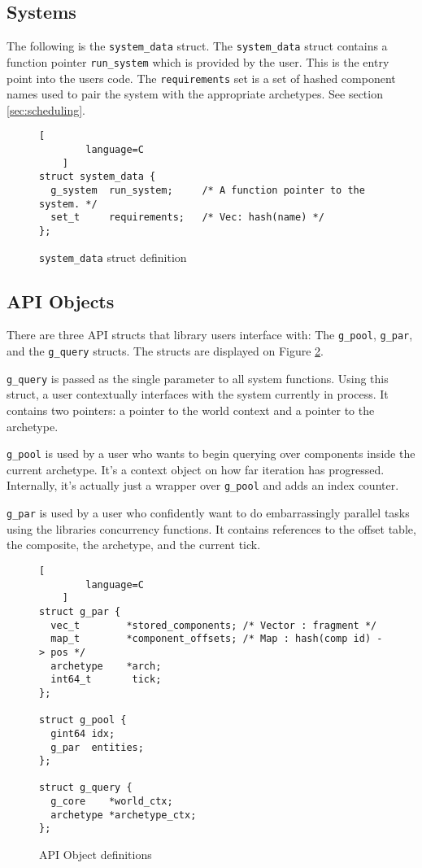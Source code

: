\subsection{Systems}
The following is the \texttt{system\_data} struct. The \texttt{system\_data} struct contains a function pointer \texttt{run\_system} which is provided by the user. This is the entry point into the users code. The \texttt{requirements} set is a set of hashed component names used to pair the system with the appropriate archetypes. See section \ref{sec:scheduling}.

\begin{figure}[H]
    \begin{lstlisting}[
        language=C
    ]
struct system_data {
  g_system  run_system;     /* A function pointer to the system. */
  set_t     requirements;   /* Vec: hash(name) */
};
    \end{lstlisting}
    \caption{\texttt{system\_data} struct definition}
    \label{code:sd_and_er}
\end{figure}

\subsection{API Objects}
There are three API structs that library users interface with: The \texttt{g\_pool}, \texttt{g\_par}, and the \texttt{g\_query} structs.  The structs are displayed on Figure \ref{code:apis}.

\texttt{g\_query} is passed as the single parameter to all system functions. Using this struct, a user contextually interfaces with the system currently in process. It contains two pointers: a pointer to the world context and a pointer to the archetype.

\texttt{g\_pool} is used by a user who wants to begin querying over components inside the current archetype. It's a context object on how far iteration has progressed. Internally, it's actually just a wrapper over \texttt{g\_pool} and adds an index counter.

\texttt{g\_par} is used by a user who confidently want to do embarrassingly parallel tasks using the libraries concurrency functions. It contains references to the offset table, the composite, the archetype, and the current tick.


\begin{figure}[htbp]
    \begin{lstlisting}[
        language=C
    ]
struct g_par {
  vec_t        *stored_components; /* Vector : fragment */
  map_t        *component_offsets; /* Map : hash(comp id) -> pos */
  archetype    *arch;
  int64_t       tick;
};

struct g_pool {
  gint64 idx;
  g_par  entities;
};

struct g_query {
  g_core    *world_ctx;
  archetype *archetype_ctx;
};
    \end{lstlisting}
    \caption{API Object definitions}
    \label{code:apis}
\end{figure}

